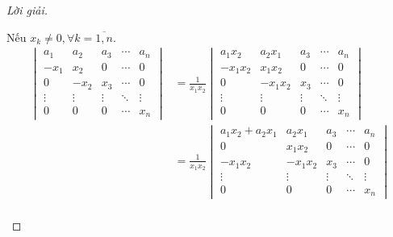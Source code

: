 \begin{proof}[Lời giải]
\begin{enumerate}[label = (\alph*)]
              Nếu $x_{k} \ne 0, \forall k=\overline{1, n}$.
              \begingroup{}
              \allowdisplaybreaks{}
              \begin{align*}
                  \begin{vmatrix}
                      a_{1}  & a_{2}  & a_{3}  & \cdots & a_{n}  \\
                      -x_{1} & x_{2}  & 0      & \cdots & 0      \\
                      0      & -x_{2} & x_{3}  & \cdots & 0      \\
                      \vdots & \vdots & \vdots & \ddots & \vdots \\
                      0      & 0      & 0      & \cdots & x_{n}
                  \end{vmatrix}
                   & =
                  \frac{1}{x_{1}x_{2}}
                  \begin{vmatrix}
                      a_{1}x_{2}  & a_{2}x_{1}  & a_{3}  & \cdots & a_{n}  \\
                      -x_{1}x_{2} & x_{1}x_{2}  & 0      & \cdots & 0      \\
                      0           & -x_{1}x_{2} & x_{3}  & \cdots & 0      \\
                      \vdots      & \vdots      & \vdots & \ddots & \vdots \\
                      0           & 0           & 0      & \cdots & x_{n}
                  \end{vmatrix}                                                                                                \\
                   & = \frac{1}{x_{1}x_{2}}
                  \begin{vmatrix}
                      a_{1}x_{2} + a_{2}x_{1} & a_{2}x_{1}  & a_{3}  & \cdots & a_{n}  \\
                      0                       & x_{1}x_{2}  & 0      & \cdots & 0      \\
                      -x_{1}x_{2}             & -x_{1}x_{2} & x_{3}  & \cdots & 0      \\
                      \vdots                  & \vdots      & \vdots & \ddots & \vdots \\
                      0                       & 0           & 0      & \cdots & x_{n}
                  \end{vmatrix}                                                                                    \\

\end{align*}
\end{enumerate}
\end{proof}
